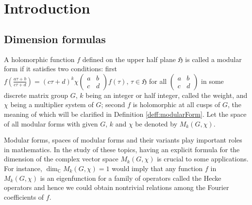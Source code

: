 \documentclass[12pt]{amsart}
\numberwithin{equation}{section}
\theoremstyle{plain}
\theoremstyle{definition}
\theoremstyle{remark}
\newcommand\tbtmat[4]{\left(\begin{smallmatrix}{#1} & {#2} \\ {#3} & {#4}\end{smallmatrix}\right)}
\newcommand\numC{\mathbb{C}}
\newcommand\uhp{\mathfrak{H}}
\begin{document}
\maketitle

\tableofcontents


\section{Introduction}
\label{sec:Introduction}
\subsection{Dimension formulas}
A holomorphic function $f$ defined on the upper half plane $\uhp$ is called a modular form if it satisfies two conditions: first $f\left(\frac{a\tau+b}{c\tau+d}\right)=(c\tau+d)^k\chi\tbtmat{a}{b}{c}{d}f(\tau),\,\tau\in\uhp$ for all $\tbtmat{a}{b}{c}{d}$ in some discrete matrix group $G$, $k$ being an integer or half integer, called the weight, and $\chi$ being a multiplier system of $G$; second $f$ is holomorphic at all cusps of $G$, the meaning of which will be clarified in Definition \ref{deff:modularForm}. Let the space of all modular forms with given $G$, $k$ and $\chi$ be denoted by $M_k(G,\chi)$.

Modular forms, spaces of modular forms and their variants play important roles in mathematics. In the study of these topics, having an explicit formula for the dimension of the complex vector space $M_k(G,\chi)$ is crucial to some applications. For instance, $\dim_\numC M_k(G,\chi)=1$ would imply that any function $f$ in $M_k(G,\chi)$ is an eigenfunction for a family of operators called the Hecke operators and hence we could obtain nontrivial relations among the Fourier coefficients of $f$.
\end{document}
